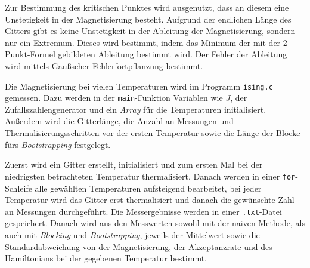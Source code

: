 	
	
	
	Zur Bestimmung des kritischen Punktes wird ausgenutzt, dass an diesem eine Unstetigkeit in der Magnetisierung besteht. Aufgrund der endlichen Länge des Gitters gibt es keine Unstetigkeit in der Ableitung der Magnetisierung, sondern nur ein Extremum. Dieses wird bestimmt, indem das Minimum der mit der 2-Punkt-Formel gebildeten Ableitung bestimmt wird. Der Fehler der Ableitung wird mittels Gaußscher Fehlerfortpflanzung bestimmt.
		
	Die Magnetisierung bei vielen Temperaturen wird im Programm \texttt{ising.c} gemessen. Dazu werden in der \texttt{main}-Funktion Variablen wie $J$, der Zufallszahlengenerator und ein \textit{Array} für die Temperaturen initialisiert. Außerdem wird die Gitterlänge, die Anzahl an Messungen und Thermalisierungsschritten vor der ersten Temperatur sowie die Länge der Blöcke fürs \textit{Bootstrapping} festgelegt. 	
	
	Zuerst wird ein Gitter erstellt, initialisiert und zum ersten Mal bei der niedrigsten betrachteten Temperatur thermalisiert. Danach werden in einer \texttt{for}-Schleife alle gewählten Temperaturen aufsteigend bearbeitet, bei jeder Temperatur wird das Gitter erst thermalisiert und danach die gewünschte Zahl an Messungen durchgeführt.
	Die Messergebnisse werden in einer \texttt{.txt}-Datei gespeichert. Danach wird aus den Messwerten sowohl mit der naiven Methode, als auch mit \textit{Blocking} und \textit{Bootstrapping}, jeweils der Mittelwert sowie die Standardabweichung von der Magnetisierung, der Akzeptanzrate und des Hamiltonians bei der gegebenen Temperatur bestimmt.
	
